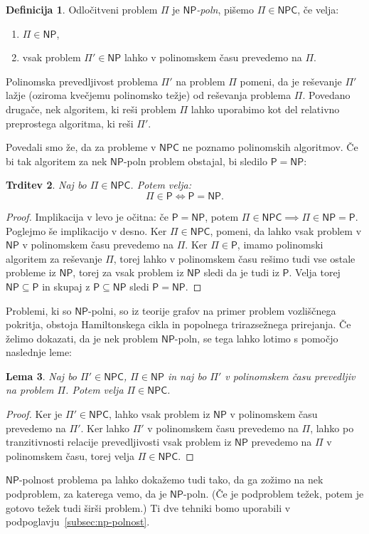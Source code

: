 \documentclass[12pt,a4paper,twoside]{article}
\theoremstyle{definition} %
\newtheorem{definicija}{Definicija}[section]
\theoremstyle{plain} %
\newtheorem{lema}[definicija]{Lema}
\newtheorem{trditev}[definicija]{Trditev}
\numberwithin{equation}{section}  %
\renewcommand{\P}{\ensuremath{\mathsf{P}}}
\newcommand{\NP}{\ensuremath{\mathsf{NP}}}
\newcommand{\NPC}{\ensuremath{\mathsf{NPC}}}
\begin{document}
\begin{definicija}
    \label{def:np-poln}
    Odločitveni problem $\Pi$ je \emph{$\NP$-poln}, pišemo $\Pi \in \NPC$, če velja:
    \begin{enumerate}
        \item $\Pi \in \NP$,
        \item vsak problem $\Pi' \in \NP$ lahko v polinomskem času prevedemo na $\Pi$.
    \end{enumerate}
\end{definicija}
Polinomska prevedljivost problema $\Pi'$ na problem $\Pi$ pomeni, da je reševanje $\Pi'$ lažje (oziroma kvečjemu polinomsko težje) od reševanja problema $\Pi$. Povedano drugače, nek algoritem, ki reši problem $\Pi$ lahko uporabimo kot del relativno preprostega algoritma, ki reši $\Pi'$. 

Povedali smo že, da za probleme v $\NPC$ ne poznamo polinomskih algoritmov. Če bi tak algoritem za nek $\NP$-poln problem obstajal, bi sledilo $\P = \NP$:
\begin{trditev}
    Naj bo $\Pi \in \NPC$. Potem velja:
    \[ \Pi \in \P \iff \P = \NP. \]
\end{trditev}
\begin{proof}
    Implikacija v levo je očitna: če $\P = \NP$, potem $\Pi \in \NPC \implies \Pi \in \NP = \P$.
    Poglejmo še implikacijo v desno. Ker $\Pi \in \NPC$, pomeni, da lahko vsak problem v $\NP$ v polinomskem času prevedemo na $\Pi$. Ker $\Pi \in \P$, imamo polinomski algoritem za reševanje $\Pi$, torej lahko v polinomskem času rešimo tudi vse ostale probleme iz $\NP$, torej za vsak problem iz $\NP$ sledi da je tudi iz $\P$. Velja torej $\NP \subseteq \P$ in skupaj z $\P \subseteq \NP$ sledi $\P = \NP$.
\end{proof}

Problemi, ki so $\NP$-polni, so iz teorije grafov na primer problem vozliščnega pokritja, obstoja Hamiltonskega cikla in popolnega trirazsežnega prirejanja. Če želimo dokazati, da je nek problem $\NP$-poln, se tega lahko lotimo s pomočjo naslednje leme:
\begin{lema}
    Naj bo $\Pi' \in \NPC$, $\Pi \in \NP$ in naj bo $\Pi'$ v polinomskem času prevedljiv na problem $\Pi$. Potem velja $\Pi \in \NPC$.
\end{lema}
\begin{proof}
    Ker je $\Pi' \in \NPC$, lahko vsak problem iz $\NP$ v polinomskem času prevedemo na $\Pi'$. Ker lahko $\Pi'$ v polinomskem času prevedemo na $\Pi$, lahko po tranzitivnosti relacije prevedljivosti vsak problem iz $\NP$ prevedemo na $\Pi$ v polinomskem času, torej velja $\Pi \in \NPC$.
\end{proof}
$\NP$-polnost problema pa lahko dokažemo tudi tako, da ga zožimo na nek podproblem, za katerega vemo, da je $\NP$-poln. (Če je podproblem težek, potem je gotovo težek tudi širši problem.)
Ti dve tehniki bomo uporabili v podpoglavju~\ref{subsec:np-polnost}.
\end{document}

